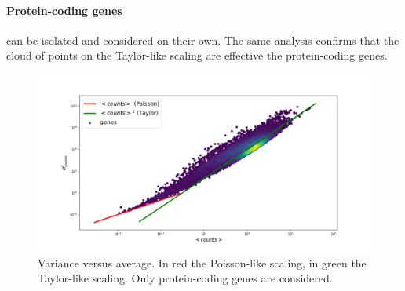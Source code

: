 \paragraph{Protein-coding genes} can be isolated and considered on their own. The same analysis confirms that the cloud of points on the Taylor-like scaling are effective the protein-coding genes.
\begin{figure}[htb!]
    \centering
    \includegraphics[width=0.95\linewidth]{pictures/scalinglaws/gtex/varmean_loglog_density.png}
    \caption{Variance versus average. In \textcolor{pythonred}{red} the Poisson-like scaling, in \textcolor{pythongreen}{green} the Taylor-like scaling. Only protein-coding genes are considered.}
    \label{fig:scalinglaws/gtex/varmean_loglog_density}
\end{figure}

